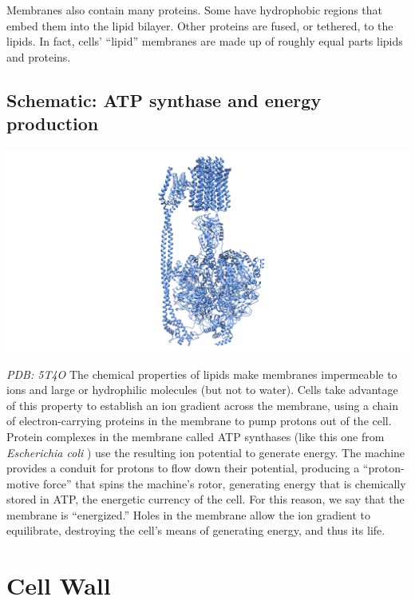 \documentclass[]{tufte-book}
\begin{document}
Membranes also contain many proteins. Some have hydrophobic regions that
embed them into the lipid bilayer. Other proteins are fused, or
tethered, to the lipids. In fact, cells' ``lipid'' membranes are made up
of roughly equal parts lipids and proteins.

\hypertarget{ATP_synthase_and_energy_production}{\subsection*{Schematic:
ATP synthase and energy
production}\label{ATP_synthase_and_energy_production}}

\includegraphics{img/schematics/2_1_2}

\emph{PDB: 5T4O} The chemical properties of lipids make membranes
impermeable to ions and large or hydrophilic molecules (but not to
water). Cells take advantage of this property to establish an ion
gradient across the membrane, using a chain of electron-carrying
proteins in the membrane to pump protons out of the cell. Protein
complexes in the membrane called ATP synthases (like this one from
\emph{Escherichia coli} \citep{sobti2016}) use the resulting ion
potential to generate energy. The machine provides a conduit for protons
to flow down their potential, producing a ``proton-motive force'' that
spins the machine's rotor, generating energy that is chemically stored
in ATP, the energetic currency of the cell. For this reason, we say that
the membrane is ``energized.'' Holes in the membrane allow the ion
gradient to equilibrate, destroying the cell's means of generating
energy, and thus its life.

\section{Cell Wall}\label{cell-wall}
\end{document}

